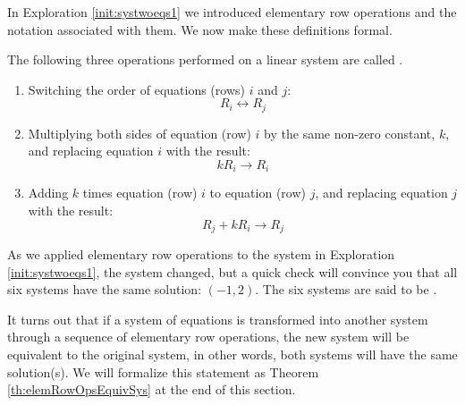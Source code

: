 \documentclass{ximera}
\begin{document}
In Exploration \ref{init:systwoeqs1} we introduced elementary row operations and the notation associated with them. We now make these definitions formal.

\begin{definition}\label{def:elemrowops}
The following three operations performed on a linear system are called .
\begin{enumerate}
\item Switching the order of equations (rows) $i$ and $j$:
$$R_i\leftrightarrow R_j$$
\item Multiplying both sides of equation (row) $i$ by the same non-zero constant, $k$, and replacing equation $i$ with the result:
$$kR_i\rightarrow R_i$$
\item Adding $k$ times equation (row) $i$ to equation (row) $j$, and replacing equation $j$ with the result:
$$R_j+kR_i\rightarrow R_j$$
\end{enumerate}
\end{definition}


As we applied elementary row operations to the system in Exploration \ref{init:systwoeqs1}, the system changed, but a quick check will convince you that all six systems have the same solution: $(-1, 2)$.  The six systems are said to be .  

It turns out that if a system of equations is transformed into another system through a sequence of elementary row operations, the new system will be equivalent to the original system, in other words, both systems will have the same solution(s).  We will formalize this statement as Theorem \ref{th:elemRowOpsEquivSys} at the end of this section.
\end{document}
